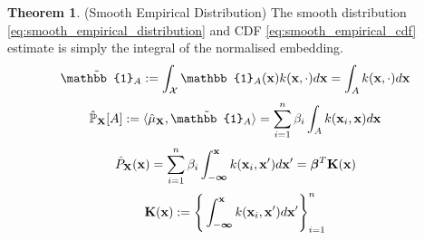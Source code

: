 \documentclass[twoside]{article} \usepackage{aistats2017}
\theoremstyle{definition}
\theoremstyle{theorem}
\newtheorem{theorem}{Theorem}[section]
\newcommand{\rv}[1]{{#1}}
\newcommand{\inner}[2]{{\langle #1, #2 \rangle}}
\begin{document}
		\begin{theorem} \label{thm:smooth_empirical_distribution_and_cdf}
			(Smooth Empirical Distribution)
			The smooth distribution \eqref{eq:smooth_empirical_distribution} and CDF \eqref{eq:smooth_empirical_cdf} estimate is simply the integral of the normalised embedding.
			\begin{equation}
				\tilde{\mathbb{1}}_{A} := \int_{\mathcal{X}} \mathbb{1}_{A}(\bvec{x}) k(\bvec{x}, \cdot) d\bvec{x} = \int_{A} k(\bvec{x}, \cdot) d\bvec{x}
			\label{eq:indicator_smooth}
			\end{equation}
			\begin{equation}
				\hat{\mathbb{P}}_{\bvec{\rv{X}}}[A] := \inner{\hat{\mu}_{\bvec{\rv{X}}}}{\tilde{\mathbb{1}}_{A}} = \sum_{i = 1}^{n} \beta_{i} \int_{A}  k(\bvec{x}_{i}, \bvec{x}) d\bvec{x}
			\label{eq:smooth_empirical_distribution}
			\end{equation}	
			\begin{equation}
				\hat{P}_{\bvec{\rv{X}}}(\bvec{x}) = \sum_{i = 1}^{n} \beta_{i} \int_{-\bm{\infty}}^{\bvec{x}}  k(\bvec{x}_{i}, \bvec{x}') d\bvec{x}' = \bm{\beta}^{T} \bvec{K}(\bvec{x})
			\label{eq:smooth_empirical_cdf}
			\end{equation}
			\begin{equation}
				\mathbf{K}(\mathbf{x}) := \Bigg\{ \int_{-\bm{\infty}}^{\mathbf{x}}  k(\mathbf{x}_{i}, \mathbf{x}') d\mathbf{x}' \Bigg\}_{i = 1}^{n}
			\label{eq:kernel_integral}
			\end{equation}
		\end{theorem}
			
\end{document}

